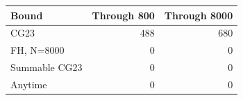 \begin{tabular}{lrr}
\toprule
Bound & Through 800 & Through 8000\\
\midrule
CG23 & 488 & 680\\
FH, N=8000 & 0 & 0\\
Summable CG23 & 0 & 0\\
Anytime & 0 & 0\\
\bottomrule
\end{tabular}
